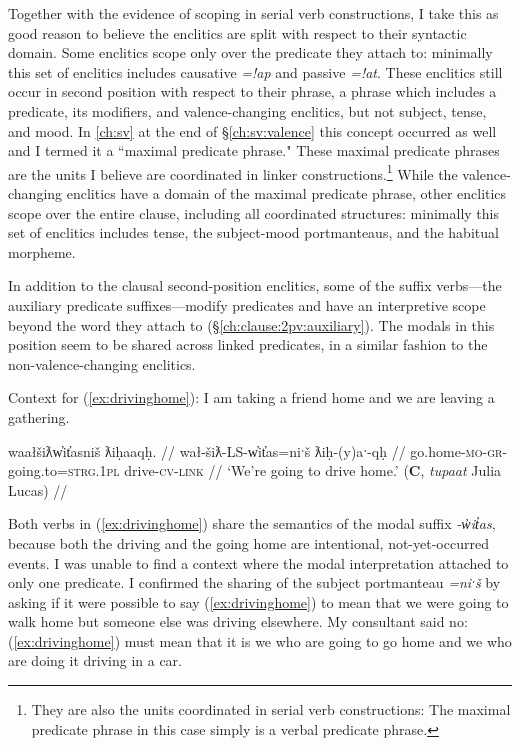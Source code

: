 Together with the evidence of scoping in serial verb constructions, I take this as good reason to believe the enclitics are split with respect to their syntactic domain. Some enclitics scope only over the predicate they attach to: minimally this set of enclitics includes causative \textit{=!ap} and passive \textit{=!at}. These enclitics still occur in second position with respect to their phrase, a phrase which includes a predicate, its modifiers, and valence-changing enclitics, but not subject, tense, and mood. In \cref{ch:sv} at the end of \S\ref{ch:sv:valence} this concept occurred as well and I termed it a ``maximal predicate phrase." These maximal predicate phrases are the units I believe are coordinated in linker constructions.\footnote{They are also the units coordinated in serial verb constructions: The maximal predicate phrase in this case simply is a verbal predicate phrase.} While the valence-changing enclitics have a domain of the maximal predicate phrase, other enclitics scope over the entire clause, including all coordinated structures: minimally this set of enclitics includes tense, the subject-mood portmanteaus, and the habitual morpheme.

In addition to the clausal second-position enclitics, some of the suffix verbs---the auxiliary predicate suffixes---modify predicates and have an interpretive scope beyond the word they attach to (\S\ref{ch:clause:2pv:auxiliary}). The modals in this position seem to be shared across linked predicates, in a similar fashion to the non-valence-changing enclitics.

\vspace{5pt}

\noindent Context for (\ref{ex:drivinghome}): I am taking a friend home and we are leaving a gathering.

\ex \label{ex:drivinghome}
\begingl
\glpreamble waałšiƛw̓it̓asniš ƛiḥaaqḥ. //
\gla wał-šiƛ-LS-w̓it̓as=niˑš ƛiḥ-(y)aˑ-qḥ //
\glb go.home-\textsc{mo}-\textsc{gr}-going.to=\textsc{strg.1pl} drive-\textsc{cv}-\textsc{link} //
\glft `We're going to drive home.' (\textbf{C}, \textit{tupaat} Julia Lucas) //
\endgl
\xe

Both verbs in (\ref{ex:drivinghome}) share the semantics of the modal suffix \textit{-w̓it̓as}, because both the driving and the going home are intentional, not-yet-occurred events. I was unable to find a context where the modal interpretation attached to only one predicate. I confirmed the sharing of the subject portmanteau \textit{=niˑš} by asking if it were possible to say (\ref{ex:drivinghome}) to mean that we were going to walk home but someone else was driving elsewhere. My consultant said no: (\ref{ex:drivinghome}) must mean that it is we who are going to go home and we who are doing it driving in a car.

